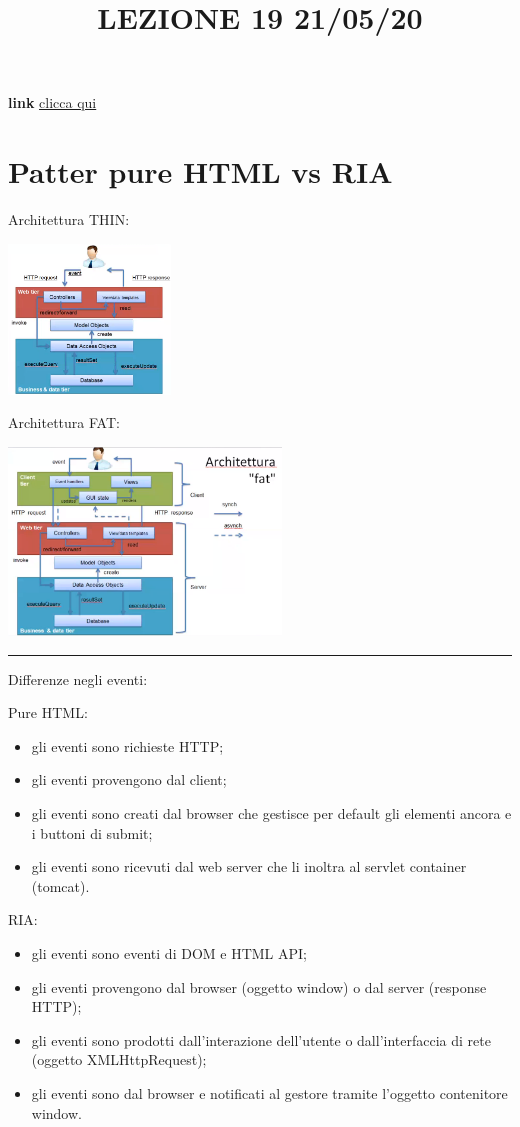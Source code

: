 \title{LEZIONE 19 21/05/20}
\textbf{link} \href{https://web.microsoftstream.com/video/9329ad3d-c8a8-48ab-b415-668ff6193e36?list=user&userId=cfe0965d-9a7c-40e2-be6e-f078296a1914}{clicca qui}
\section{Patter pure HTML vs RIA}
Architettura THIN:
\begin{center}
    \includegraphics[height=4cm]{../lezione19/img1.PNG}
\end{center}
Architettura FAT:
\begin{center}
    \includegraphics[height=5cm]{../lezione19/img2.PNG}
\end{center} 
\rule{\textwidth}{0,4pt}
Differenze negli eventi:
\begin{multicols}{2}
Pure HTML:
\begin{itemize}
    \item gli eventi sono richieste HTTP;
    \item gli eventi provengono dal client;
    \item gli eventi sono creati dal browser che gestisce per default gli elementi ancora e i buttoni di submit;
    \item gli eventi sono ricevuti dal web server che li inoltra al servlet container (tomcat).
\end{itemize}
\vfill\null
\columnbreak
RIA:
\begin{itemize}
    \item gli eventi sono eventi di DOM e HTML API;
    \item gli eventi provengono dal browser (oggetto window) o dal server (response HTTP);
    \item gli eventi sono prodotti dall'interazione dell'utente o dall'interfaccia di rete (oggetto XMLHttpRequest);
    \item gli eventi sono dal browser e notificati al gestore tramite l'oggetto contenitore window.
\end{itemize}
\end{multicols}
